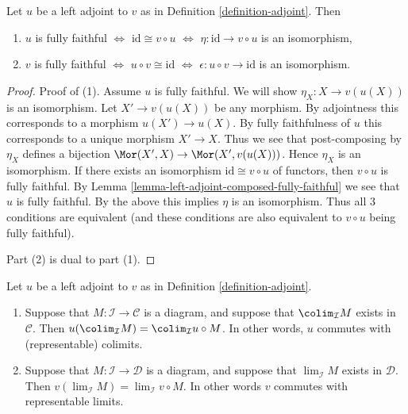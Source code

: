 \begin{lemma}
\label{lemma-adjoint-fully-faithful}
Let $u$ be a left adjoint to $v$ as in Definition \ref{definition-adjoint}.
Then
\begin{enumerate}
\item $u$ is fully faithful $\Leftrightarrow$ $\text{id} \cong v \circ u$
$\Leftrightarrow$ $\eta : \text{id} \to v \circ u$ is an isomorphism,
\item $v$ is fully faithful $\Leftrightarrow$
$u \circ v \cong \text{id}$ $\Leftrightarrow$
$\epsilon : u \circ v \to \text{id}$ is an isomorphism.
\end{enumerate}
\end{lemma}

\begin{proof}
Proof of (1).
Assume $u$ is fully faithful. We will show $\eta_X : X \to v(u(X))$
is an isomorphism. Let $X' \to v(u(X))$ be any morphism.
By adjointness this corresponds to a morphism $u(X') \to u(X)$. By fully
faithfulness of $u$ this corresponds to a unique morphism $X' \to X$.
Thus we see that post-composing by $\eta_X$ defines a bijection
$\Mor(X', X) \to \Mor(X', v(u(X)))$. Hence $\eta_X$ is an isomorphism.
If there exists an isomorphism $\text{id} \cong v \circ u$ of functors,
then $v \circ u$ is fully faithful. By
Lemma \ref{lemma-left-adjoint-composed-fully-faithful} we see
that $u$ is fully faithful. By the above this implies $\eta$
is an isomorphism. Thus all $3$ conditions are equivalent (and these
conditions are also equivalent to $v \circ u$ being fully faithful).

\medskip\noindent
Part (2) is dual to part (1).
\end{proof}

\begin{lemma}
\label{lemma-adjoint-exact}
Let $u$ be a left adjoint to $v$ as in Definition \ref{definition-adjoint}.
\begin{enumerate}
\item Suppose that $M : \mathcal{I} \to \mathcal{C}$ is a diagram,
and suppose that $\colim_\mathcal{I} M$ exists in
$\mathcal{C}$. Then $u(\colim_\mathcal{I} M) =
\colim_\mathcal{I} u \circ M$. In other words,
$u$ commutes with (representable) colimits.
\item Suppose that $M : \mathcal{I} \to \mathcal{D}$ is a diagram,
and suppose that $\lim_\mathcal{I} M$ exists in
$\mathcal{D}$. Then $v(\lim_\mathcal{I} M) =
\lim_\mathcal{I} v \circ M$. In other words $v$ commutes
with representable limits.
\end{enumerate}
\end{lemma}

